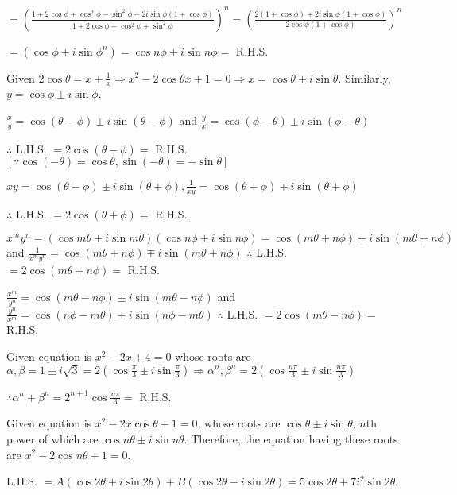   $= \left(\frac{1+ 2\cos\phi + \cos^2\phi - \sin^2\phi + 2i \sin\phi(1 + \cos\phi)}{1 + 2\cos\phi +
  \cos^2\phi + \sin^2\phi}\right)^n= \left(\frac{2(1 + \cos\phi) + 2i \sin\phi(1 +
  \cos\phi)}{2\cos\phi(1 + \cos\phi)}\right)^n$

  $= (\cos\phi + i \sin\phi^n) = \cos n\phi + i \sin n\phi =$ R.H.S.
\item Given $2\cos\theta = x + \frac{1}{x} \Rightarrow x^2 - 2\cos\theta x + 1 = 0 \Rightarrow x =
  \cos\theta\pm i\sin\theta$. Similarly, $y = \cos\phi\pm i\sin\phi$.
  \startitemize[i]
  \item $\frac{x}{y} = \cos(\theta - \phi) \pm i\sin(\theta - \phi)$ and $\frac{y}{x} = \cos(\phi -
    \theta)\pm i\sin(\phi - \theta)$

    $\therefore$ L.H.S. $= 2\cos(\theta - \phi) =$ R.H.S. $[\because \cos(-\theta) = \cos\theta,
      \sin(-\theta) = -\sin\theta]$
  \item $xy = \cos(\theta + \phi) \pm i\sin(\theta + \phi), \frac{1}{xy} = \cos(\theta + \phi)\mp
    i\sin(\theta + \phi)$

    $\therefore$ L.H.S. $= 2\cos(\theta + \phi) =$ R.H.S.
  \item $x^my^n = (\cos m\theta \pm i\sin m\theta)(\cos n\phi \pm i\sin n\phi) = \cos(m\theta + n\phi)\pm
    i\sin(m\theta + n\phi)$ and $\frac{1}{x^my^n} = \cos(m\theta + n\phi)\mp i\sin(m\theta + n\phi)$
    $\therefore$ L.H.S. $= 2\cos(m\theta + n\phi) =$ R.H.S.
  \item $\frac{x^m}{y^n} = \cos(m\theta - n\phi)\pm i\sin(m\theta - n\phi)$ and $\frac{y^n}{x^m} =
    \cos(n\phi - m\theta)\pm i\sin(n\phi - m\theta)$
    $\therefore$ L.H.S. $= 2\cos(m\theta - n\phi) =$ R.H.S.
  \stopitemize
\item Given equation is $x^2 - 2x + 4 = 0$ whose roots are $\alpha, \beta = 1\pm i\sqrt{3} =
  2\left(\cos\frac{\pi}{3}\pm i\sin\frac{\pi}{3}\right)\Rightarrow \alpha^n, \beta^n =
  2\left(\cos\frac{n\pi}{3}\pm i\sin\frac{n\pi}{3}\right)$

  $\therefore \alpha^n + \beta^n = 2^{n + 1}\cos\frac{n\pi}{3} =$ R.H.S.
\item Given equation is $x^2 - 2x\cos\theta + 1 = 0$, whose roots are $\cos\theta \pm i\sin\theta$, $n$th
  power of which are $\cos n\theta \pm i\sin n\theta$. Therefore, the equation having these roots are $x^2 -
  2\cos n\theta + 1 = 0$.
\item L.H.S. $= A(\cos2\theta + i\sin2\theta) + B(\cos2\theta - i\sin2\theta) = 5\cos2\theta +
  7i^2\sin2\theta$.

